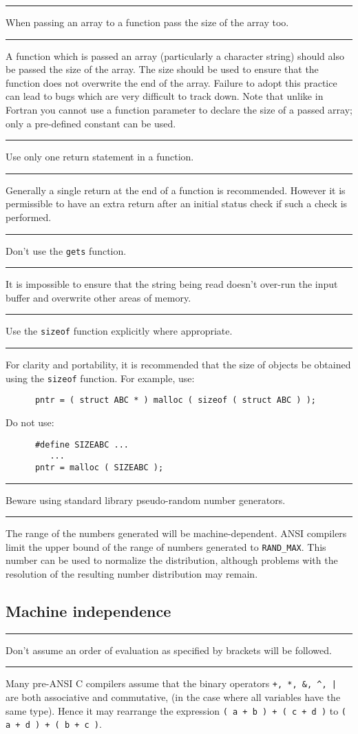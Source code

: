 \documentclass[twoside,11pt]{article}
\newcounter{sruleno}
\newcommand{\srule}[1]{
    \addtocounter{sruleno}{1}
    \goodbreak
    \rule[0.5ex]{\textwidth}{0.3mm}
    {\Large #1 \hfill {\thesruleno}}
    \rule[0.5ex]{\textwidth}{0.1mm}
}
\newcommand{\srule}[1]{
       \addtocounter{sruleno}{1}
       \begin{rawhtml} <HR> \end{rawhtml}
       {\Large \thesruleno}~~~~{\Large #1}
       \begin{rawhtml} <HR> \end{rawhtml}
       \end{tabular}
  }
\begin{document}
\srule{When passing an array to a function pass the size of the array 
too.}
A function which is passed an array (particularly a 
character string) should also be passed the size of the array.
The size should be used to ensure that the function does not overwrite the 
end of the array.
Failure to adopt this practice can lead to bugs which are very difficult to 
track down.  Note that unlike in Fortran you cannot use a function parameter 
to declare the size of a passed array; only a pre-defined constant can be used.


\srule{Use only one return statement in a function.}
Generally a single return at the end of a function is recommended.
However it is permissible to have an extra return after 
an initial status check if such a check is performed.


\srule{Don't use the {\tt gets} function.}
It is impossible to ensure that the string being
read doesn't over-run the input buffer and overwrite other areas of memory.

\srule{Use the {\tt sizeof} function explicitly where appropriate.}
For clarity and portability, it is recommended that the size of objects be
obtained using the \verb~sizeof~ function.
For example, use:
\begin{verbatim}
      pntr = ( struct ABC * ) malloc ( sizeof ( struct ABC ) );
\end{verbatim}

Do not use:
\begin{verbatim}
      #define SIZEABC ...
         ...
      pntr = malloc ( SIZEABC );
\end{verbatim}


\srule{Beware using standard library pseudo-random number generators.}
The range of the numbers generated will be machine-dependent.
ANSI compilers limit the upper bound of the range of numbers generated to 
{\tt RAND\_MAX}. 
This number can be used to normalize the distribution, although
problems with the resolution of the resulting number distribution may remain.


\subsection{Machine independence}


\srule{Don't assume an order of evaluation as specified by brackets 
will be followed.}
Many pre-ANSI C compilers assume that the binary operators 
\verb~+, *, &, ^, |~
are both associative and commutative, (in the case where all variables have 
the same type).
Hence it may rearrange the expression
{\tt ( a + b ) + ( c + d )} to {\tt ( a + d ) + ( b + c )}.
\end{document}
